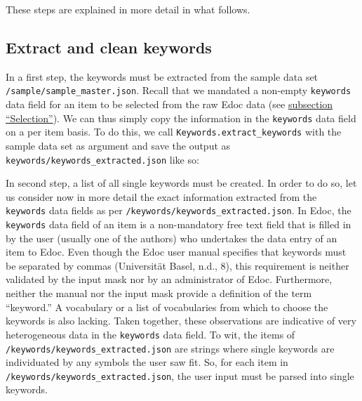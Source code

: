 These steps are explained in more detail in what follows.

\hypertarget{extract-and-clean-keywords}{%
\subsection{Extract and clean
keywords}\label{extract-and-clean-keywords}}

In a first step, the keywords must be extracted from the sample data set
\texttt{/sample/sample\_master.json}. Recall that we mandated a
non-empty \texttt{keywords} data field for an item to be selected from
the raw Edoc data (see \protect\hyperlink{selection}{subsection
``Selection''}). We can thus simply copy the information in the
\texttt{keywords} data field on a per item basis. To do this, we call
\texttt{Keywords.extract\_keywords} with the sample data set as argument
and save the output as \texttt{keywords/keywords\_extracted.json} like
so:

\begin{Shaded}
\begin{Highlighting}[]
\OperatorTok{=}\NormalTok{)}
\NormalTok{)}
\end{Highlighting}
\end{Shaded}

In second step, a list of all single keywords must be created. In order
to do so, let us consider now in more detail the exact information
extracted from the \texttt{keywords} data fields as per
\texttt{/keywords/keywords\_extracted.json}. In Edoc, the
\texttt{keywords} data field of an item is a non-mandatory free text
field that is filled in by the user (usually one of the authors) who
undertakes the data entry of an item to Edoc. Even though the Edoc user
manual specifies that keywords must be separated by commas (Universität
Basel, n.d., 8), this requirement is neither validated by the input mask
nor by an administrator of Edoc. Furthermore, neither the manual nor the
input mask provide a definition of the term ``keyword.'' A vocabulary or
a list of vocabularies from which to choose the keywords is also
lacking. Taken together, these observations are indicative of very
heterogeneous data in the \texttt{keywords} data field. To wit, the
items of \texttt{/keywords/keywords\_extracted.json} are strings where
single keywords are individuated by any symbols the user saw fit. So,
for each item in \texttt{/keywords/keywords\_extracted.json}, the user
input must be parsed into single keywords.

